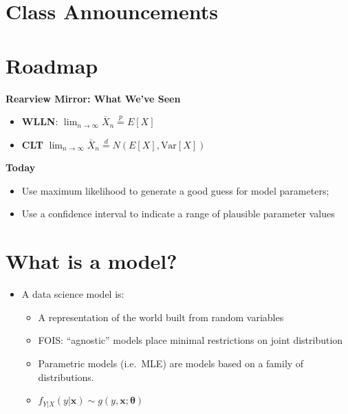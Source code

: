 \documentclass[
]{book}
\providecommand{\tightlist}{%
  \setlength{\itemsep}{0pt}\setlength{\parskip}{0pt}}
\theoremstyle{definition}
\theoremstyle{definition}
\theoremstyle{definition}
\theoremstyle{definition}
\theoremstyle{remark}
\begin{document}
\section{Class Announcements}\label{class-announcements-12}

\section{Roadmap}\label{roadmap-10}

\textbf{Rearview Mirror: What We've Seen}

\begin{itemize}
\tightlist
\item
  \textbf{WLLN}: \(\displaystyle\lim_{n \to \infty} \overline{X}_n \overset{p}{=} E[X]\)
\item
  \textbf{CLT} \(\displaystyle\lim_{n \to \infty} \bar{X}_n \overset{d}{=}  N(E[X], \text{Var}[X])\)
\end{itemize}

\textbf{Today}

\begin{itemize}
\tightlist
\item
  Use maximum likelihood to generate a good guess for model parameters;
\item
  Use a confidence interval to indicate a range of plausible parameter values
\end{itemize}

\section{What is a model?}\label{what-is-a-model}

\begin{itemize}
\tightlist
\item
  A data science model is:

  \begin{itemize}
  \tightlist
  \item
    A representation of the world built from random variables
  \item
    FOIS: ``agnostic'' models place minimal restrictions on joint distribution
  \item
    Parametric models (i.e.~MLE) are models based on a family of distributions.
  \item
    \(f_{Y|X}(y|\mathbf{x}) \sim g(y, \mathbf{x}; \mathbf{\theta})\)
  \end{itemize}
\end{itemize}
\end{document}
